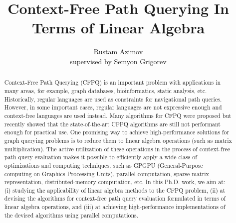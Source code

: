 \documentclass[sigconf, nonacm]{acmart}
\begin{document}
\title{Context-Free Path Querying In Terms of Linear Algebra}

\author{Rustam Azimov \\ supervised by Semyon Grigorev} 

\begin{abstract}
Context-Free Path Querying (CFPQ) is an important problem with applications in many areas, for example, graph databases, bioinformatics, static analysis, etc. Historically, regular languages are used as constraints for
navigational path queries. However, in some important cases, regular languages are not expressive enough and context-free languages are used instead. Many algorithms for CFPQ were proposed but recently showed
that the state-of-the-art CFPQ algorithms are still not performant enough for practical use. One promising way to achieve
high-performance solutions for graph querying problems is to
reduce them to linear algebra operations (such as matrix
multiplication). The active utilization of these operations in the process of context-free path query evaluation
makes it possible to efficiently apply a wide class of optimizations
and computing techniques, such as GPGPU (General-Purpose computing on Graphics Processing Units), parallel computation, sparse
matrix representation, distributed-memory computation, etc. In this Ph.D. work, we aim at: (i) studying the applicability of linear algebra methods to the CFPQ problem, (ii) at devising the algorithms for context-free path query evaluation formulated in terms of linear algebra operations, and (iii) at achieving high-performance implementations of the devised algorithms using parallel computations.
\end{abstract}

\maketitle
\end{document}
